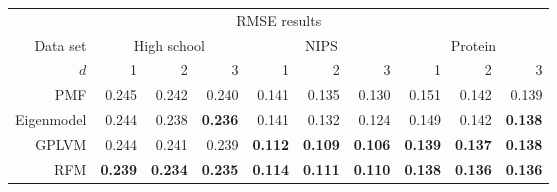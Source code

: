 
\begin{center}
  \begin{tabular}{r | r r r | r r r | r r r}
    \multicolumn{10}{c}{RMSE results} \\
    \addlinespace[2pt]
    Data set & \multicolumn{3}{c|}{High school} & \multicolumn{3}{c|}{NIPS} & \multicolumn{3}{c}{Protein} \\
    $d$ & 1 & 2 & 3 & 1 & 2 & 3 & 1 & 2 & 3 \\
    \midrule
    PMF                   & 0.245 & 0.242 & 0.240 & 0.141 & 0.135 & 0.130 & 0.151 & 0.142 & 0.139 \\
    Eigenmodel            & 0.244 & 0.238 & \textbf{0.236} & 0.141 & 0.132 & 0.124 & 0.149 & 0.142 & \textbf{0.138} \\
    GPLVM                 &0.244 & 0.241 & 0.239 & \textbf{0.112} & \textbf{0.109} & \textbf{0.106} & \textbf{0.139} & \textbf{0.137} & \textbf{0.138} \\
    RFM & \textbf{0.239} & \textbf{0.234} & \textbf{0.235} & \textbf{0.114} & \textbf{0.111} & \textbf{0.110} & \textbf{0.138} & \textbf{0.136} & \textbf{0.136}
  \end{tabular}
\end{center}

